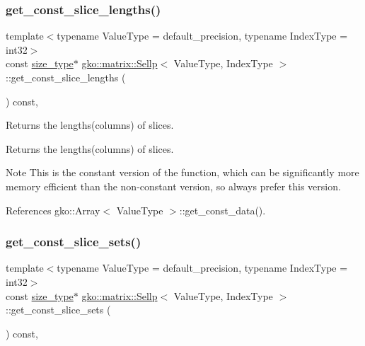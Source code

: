 \subsubsection{\texorpdfstring{get\+\_\+const\+\_\+slice\+\_\+lengths()}{get\_const\_slice\_lengths()}}
{\footnotesize\ttfamily template$<$typename Value\+Type = default\+\_\+precision, typename Index\+Type = int32$>$ \\
const \hyperlink{namespacegko_a6e5c95df0ae4e47aab2f604a22d98ee7}{size\+\_\+type}$\ast$ \hyperlink{classgko_1_1matrix_1_1Sellp}{gko\+::matrix\+::\+Sellp}$<$ Value\+Type, Index\+Type $>$\+::get\+\_\+const\+\_\+slice\+\_\+lengths (\begin{DoxyParamCaption}{ }\end{DoxyParamCaption}) const\hspace{0.3cm}{\ttfamily [inline]}, {\ttfamily [noexcept]}}



Returns the lengths(columns) of slices. 

\begin{DoxyReturn}{Returns}
the lengths(columns) of slices.
\end{DoxyReturn}
\begin{DoxyNote}{Note}
This is the constant version of the function, which can be significantly more memory efficient than the non-\/constant version, so always prefer this version. 
\end{DoxyNote}


References gko\+::\+Array$<$ Value\+Type $>$\+::get\+\_\+const\+\_\+data().

\mbox{\label{classgko_1_1matrix_1_1Sellp_a1b5bcac41afe4dee75994ad05c1ffc81}} 
\subsubsection{\texorpdfstring{get\+\_\+const\+\_\+slice\+\_\+sets()}{get\_const\_slice\_sets()}}
{\footnotesize\ttfamily template$<$typename Value\+Type = default\+\_\+precision, typename Index\+Type = int32$>$ \\
const \hyperlink{namespacegko_a6e5c95df0ae4e47aab2f604a22d98ee7}{size\+\_\+type}$\ast$ \hyperlink{classgko_1_1matrix_1_1Sellp}{gko\+::matrix\+::\+Sellp}$<$ Value\+Type, Index\+Type $>$\+::get\+\_\+const\+\_\+slice\+\_\+sets (\begin{DoxyParamCaption}{ }\end{DoxyParamCaption}) const\hspace{0.3cm}{\ttfamily [inline]}, {\ttfamily [noexcept]}}



